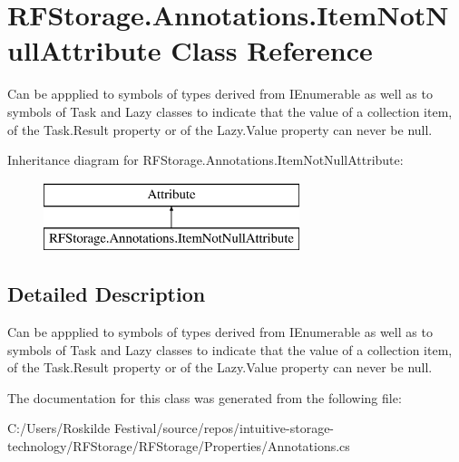 \hypertarget{class_r_f_storage_1_1_annotations_1_1_item_not_null_attribute}{}\section{R\+F\+Storage.\+Annotations.\+Item\+Not\+Null\+Attribute Class Reference}
\label{class_r_f_storage_1_1_annotations_1_1_item_not_null_attribute}


Can be appplied to symbols of types derived from I\+Enumerable as well as to symbols of Task and Lazy classes to indicate that the value of a collection item, of the Task.\+Result property or of the Lazy.\+Value property can never be null.  


Inheritance diagram for R\+F\+Storage.\+Annotations.\+Item\+Not\+Null\+Attribute\+:\begin{figure}[H]
\begin{center}
\leavevmode
\includegraphics[height=2.000000cm]{class_r_f_storage_1_1_annotations_1_1_item_not_null_attribute}
\end{center}
\end{figure}


\subsection{Detailed Description}
Can be appplied to symbols of types derived from I\+Enumerable as well as to symbols of Task and Lazy classes to indicate that the value of a collection item, of the Task.\+Result property or of the Lazy.\+Value property can never be null. 



The documentation for this class was generated from the following file\+:\begin{DoxyCompactItemize}
\item 
C\+:/\+Users/\+Roskilde Festival/source/repos/intuitive-\/storage-\/technology/\+R\+F\+Storage/\+R\+F\+Storage/\+Properties/Annotations.\+cs\end{DoxyCompactItemize}
